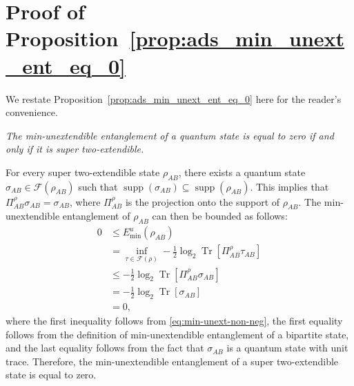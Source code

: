 \documentclass[twocolumn,letterpaper, dvipsnames,allowtoday, accepted = 2025-12-31]{quantumarticle}
\begin{document}
\section{Proof of Proposition~\ref{prop:ads_min_unext_ent_eq_0}} \label{app:ads_min_unext_ent_eq_0}

We restate Proposition~\ref{prop:ads_min_unext_ent_eq_0} here for the reader's convenience.

\emph{The min-unextendible entanglement of a quantum state is equal to zero if and only if it is super two-extendible. }

\medskip

For every super two-extendible state $\rho_{AB}$, there exists a quantum state $\sigma_{AB}\in \mathcal{F}\!\left(\rho_{AB}\right)$ such that $\operatorname{supp}\!\left(\sigma_{AB}\right)\subseteq \operatorname{supp}\!\left(\rho_{AB}\right)$. This implies that $\Pi^{\rho}_{AB}\sigma_{AB}  = \sigma_{AB}$, where $\Pi^{\rho}_{AB}$ is the projection onto the support of $\rho_{AB}$. The min-unextendible entanglement of $\rho_{AB}$ can then be bounded as follows:
\begin{align}
    0 &\le E^u_{\min}\!\left(\rho_{AB}\right)\\
    &=\inf_{\tau \in \mathcal{F}\left(\rho\right)} -\frac{1}{2}\log_2\operatorname{Tr}\!\left[\Pi^{\rho}_{AB}\tau_{AB}\right]\\
    &\le -\frac{1}{2}\log_2\operatorname{Tr}\!\left[\Pi^{\rho}_{AB}\sigma_{AB}\right]\\
    &= -\frac{1}{2}\log_2\operatorname{Tr}\!\left[\sigma_{AB}\right]\\
    &= 0,
\end{align}
where the first inequality follows from \eqref{eq:min-unext-non-neg}, the first equality follows from the definition of min-unextendible entanglement of a bipartite state, and the last equality follows from the fact that $\sigma_{AB}$ is a quantum state with unit trace. Therefore, the min-unextendible entanglement of a super two-extendible state is equal to zero.
\end{document}
